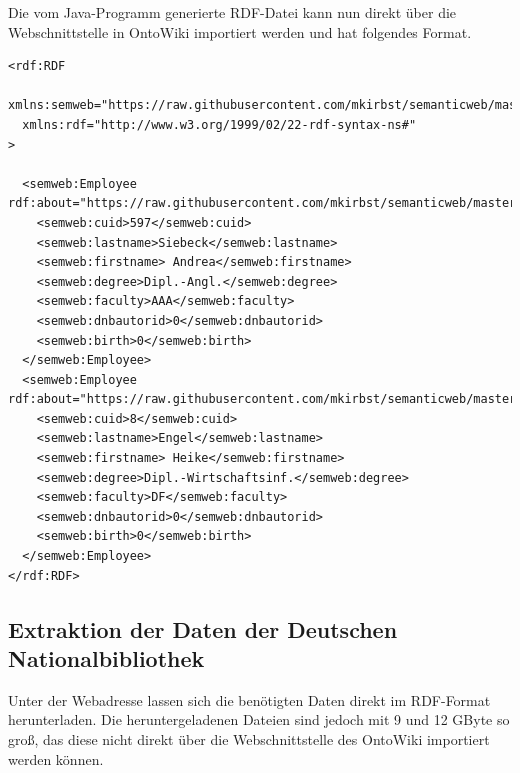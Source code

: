 \documentclass[parskip]{scrartcl}
\begin{document}
Die vom Java-Programm generierte RDF-Datei kann nun direkt über die Webschnittstelle in OntoWiki importiert werden und hat folgendes Format.
\begin{lstlisting}[captionpos=b, caption=RDF-Format der exportierten HTWK-Mitarbeiterdaten, label=RDF-Format der exportierten HTWK-Mitarbeiterdaten]
<rdf:RDF
  xmlns:semweb="https://raw.githubusercontent.com/mkirbst/semanticweb/master/scheme#"
  xmlns:rdf="http://www.w3.org/1999/02/22-rdf-syntax-ns#"
>

  <semweb:Employee rdf:about="https://raw.githubusercontent.com/mkirbst/semanticweb/master/htwkstaff.json#cuid597">
    <semweb:cuid>597</semweb:cuid>
    <semweb:lastname>Siebeck</semweb:lastname>
    <semweb:firstname> Andrea</semweb:firstname>
    <semweb:degree>Dipl.-Angl.</semweb:degree>
    <semweb:faculty>AAA</semweb:faculty>
    <semweb:dnbautorid>0</semweb:dnbautorid>
    <semweb:birth>0</semweb:birth>
  </semweb:Employee>
  <semweb:Employee rdf:about="https://raw.githubusercontent.com/mkirbst/semanticweb/master/htwkstaff.json#cuid8">
    <semweb:cuid>8</semweb:cuid>
    <semweb:lastname>Engel</semweb:lastname>
    <semweb:firstname> Heike</semweb:firstname>
    <semweb:degree>Dipl.-Wirtschaftsinf.</semweb:degree>
    <semweb:faculty>DF</semweb:faculty>
    <semweb:dnbautorid>0</semweb:dnbautorid>
    <semweb:birth>0</semweb:birth>
  </semweb:Employee>
</rdf:RDF>
\end{lstlisting}

\subsection{Extraktion der Daten der Deutschen Nationalbibliothek}
Unter der Webadresse \cite{dnbdata} lassen sich die benötigten Daten direkt im RDF-Format herunterladen. Die heruntergeladenen Dateien sind jedoch mit 9 und 12 GByte so groß,
das diese nicht direkt über die Webschnittstelle des OntoWiki importiert werden können. 
\end{document}
